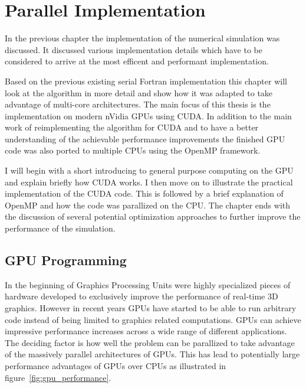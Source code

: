 \documentclass[a4paper,11pt]{kth-mag}
\begin{document}
\chapter{Parallel Implementation}
In the previous chapter the implementation of the numerical simulation was discussed. It discussed various implementation details which have to be considered to arrive at the most efficent and performant implementation.

Based on the previous existing serial Fortran implementation this chapter will look at the algorithm in more detail and show how it was adapted to take advantage of multi-core architectures. The main focus of this thesis is the implementation
on modern nVidia GPUs using CUDA. In addition to the main work of reimplementing the algorithm for CUDA and to have a better understanding of the achievable performance improvements the finished GPU code was also ported to multiple CPUs using the OpenMP framework.

I will begin with a short introducing to general purpose computing on the GPU and explain briefly how CUDA works. I then move on to illustrate the practical implementation of the CUDA code. This is followed by a brief explanation of OpenMP and how the code was parallized on the CPU. The chapter ends with the discussion of several potential optimization approaches to further improve the performance of the simulation.

\section{GPU Programming}
In the beginning of Graphics Processing Units were highly specialized pieces of hardware developed to exclusively improve the performance of real-time 3D graphics. However in recent years GPUs have started to be able to run arbitrary code instead of being limited to graphics related computations. GPUs can achieve impressive performance increases across a wide range of different applications. The deciding factor is how well the problem can be parallized to take advantage of the massively parallel architectures of GPUs. This has lead to potentially large performance advantages of GPUs over CPUs as illustrated in figure~\ref{fig:gpu_performance}.
\end{document}
